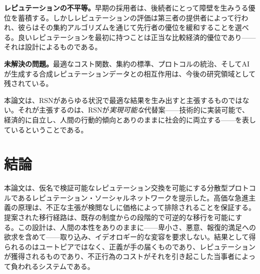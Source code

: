 \documentclass[11pt,a4paper,twocolumn]{article}
\begin{document}
\textbf{レピュテーションの不平等。}早期の採用者は、後続者にとって障壁を生みうる優位を蓄積する。しかしレピュテーションの評価は第三者の提供者によって行われ、彼らはその集約アルゴリズムを通じて先行者の優位を緩和することを選べる。良いレピュテーションを最初に持つことは正当な比較経済的優位であり——それは設計によるものである。

\textbf{未解決の問題。}最適なコスト関数、集約の標準、プロトコルの統治、そしてAIが生成する合成レピュテーションデータとの相互作用は、今後の研究領域として残されている。

本論文は、RSNがあらゆる状況で最適な結果を生み出すと主張するものではない。それが主張するのは、RSNが\emph{実現可能な}代替案——技術的に実装可能で、経済的に自立し、人間の行動的傾向とありのままに社会的に両立する——を表しているということである。

\section{結論}

本論文は、仮名で検証可能なレピュテーション交換を可能にする分散型プロトコルであるレピュテーション・ソーシャルネットワークを提示した。高価な急進主義の原理は、不正な主張が検閲なしに価格によって排除されることを保証する。提案された移行経路は、既存の制度からの段階的で可逆的な移行を可能にする。この設計は、人間の本性をありのままに——卑小さ、悪意、報復的満足への欲求を含めて——取り込み、イデオロギー的な変容を要求しない。結果として得られるのはユートピアではなく、正義が手の届くものであり、レピュテーションが獲得されるものであり、不正行為のコストがそれを引き起こした当事者によって負われるシステムである。


\end{document}
